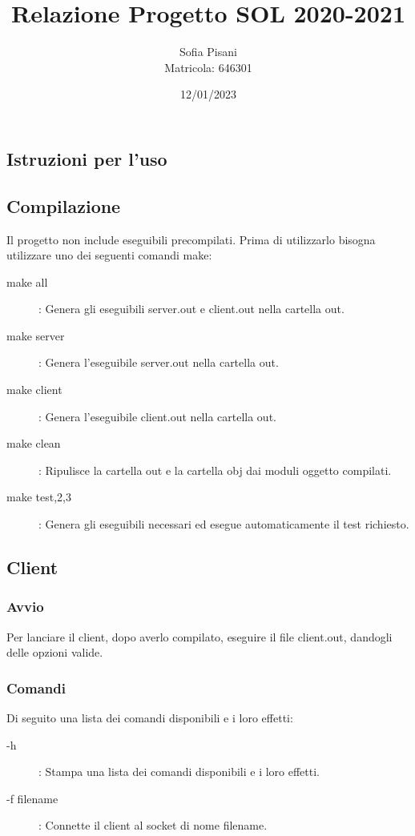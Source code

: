 \documentclass[11pt]{article}
\title{Relazione Progetto SOL 2020-2021}
\date{12/01/2023}
\author{Sofia Pisani \\ Matricola: 646301}
\begin{document}
\maketitle
{}
\newpage
\tableofcontents
\newpage
{}
\begin{flushleft}
\section{Istruzioni per l'uso}
\subsection{Compilazione}
Il progetto non include eseguibili precompilati. Prima di utilizzarlo bisogna utilizzare uno dei seguenti comandi make:
\begin{description}
\item[make all] : Genera gli eseguibili server.out e client.out nella cartella out.
\item[make server] : Genera l'eseguibile server.out nella cartella out.
\item[make client] : Genera l'eseguibile client.out nella cartella out.
\item[make clean] : Ripulisce la cartella out e la cartella obj dai moduli oggetto compilati.
\item[make test,2,3\rbrack]: Genera gli eseguibili necessari ed esegue automaticamente il test richiesto.
\end{description}
\subsection{Client}
\subsubsection{Avvio}
Per lanciare il client, dopo averlo compilato, eseguire il file client.out, dandogli delle opzioni valide.
\subsubsection{Comandi}
Di seguito una lista dei comandi disponibili e i loro effetti:
\begin{description}

\item[-h] : Stampa una lista dei comandi disponibili e i loro effetti.

\item[-f filename]: Connette il client al socket di nome filename.


\end{description}
\end{flushleft}
\end{document}
